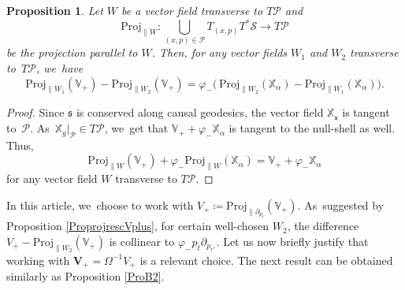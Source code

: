 \documentclass[10pt]{amsart}
\theoremstyle{plain}
\newtheorem{proposition}{Proposition}[section]
\theoremstyle{definition}
\newcommand\T{{\mathbb{X}}}
\begin{document}
\begin{proposition}
Let $W$ be a vector field transverse to $T \mathcal{P}$ and
\[
\mathrm{Proj}_{\parallel W} : \bigcup_{(x,p) \in \mathcal{P}} T_{(x,p)}T^* \mathcal{S} \to T \mathcal{P}
\]
be the projection parallel to $W$. Then, for any vector fields $W_1$ and $W_2$ transverse to~$T\mathcal{P}$, we~have
\[
\mathrm{Proj}_{\parallel W_1} (\mathbb{V}_+)-\mathrm{Proj}_{\parallel W_2} (\mathbb{V}_+)=\varphi_- \bigl(\, \mathrm{Proj}_{\parallel W_2} (\T_\alpha)-\mathrm{Proj}_{\parallel W_1} (\T_\alpha) \bigr).
\]
\end{proposition}
\begin{proof}
Since $\mathfrak{s}$ is conserved along causal geodesics, the vector field $\T_{\mathfrak{s}}$ is tangent to~$\mathcal{P}$. As~$\T_g\vert_{\mathcal{P}} \in T\mathcal{P}$, we~get that $\mathbb{V}_++\varphi_- \T_{\alpha}$ is tangent to the null-shell as well. Thus,
\[
\mathrm{Proj}_{\parallel W} (\mathbb{V}_+)+\varphi_- \mathrm{Proj}_{\parallel W} (\T_\alpha)= \mathbb{V}_++\varphi_- \T_\alpha
\]
for any vector field $W$ transverse to $T \mathcal{P}$.
\end{proof}

In this article, we~choose to work with $V_+ \! \coloneqq \mathrm{Proj}_{\parallel \partial_{p_t}} (\mathbb{V}_+)$. As~suggested by Proposition \ref{ProprojrescVplus}, for certain well-chosen $W_2$, the difference $V_+-\mathrm{Proj}_{\parallel W_2} (\mathbb{V}_+)$ is collinear to $\varphi_- p_t \partial_{p_{r^*}}$. Let us now briefly justify that working with $\pmb{V}_{\! +}\!=\Omega^{-1} V_+$ is a relevant choice. The next result can be obtained similarly as Proposition \ref{ProB2}.
\end{document}
